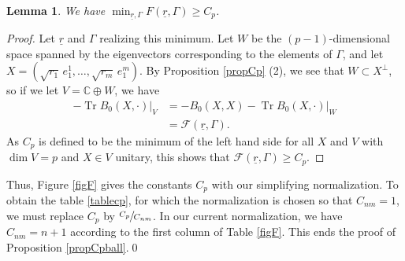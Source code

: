 \documentclass[JEP,XML,SOM,Unicode, NoEqCountersInSection,NoFloatCountersInSection,published]{cedram}
\let\mathcal\mathscr
\DeclareMathOperator{\Tr}{Tr}
\theoremstyle{theorem}
\newtheorem{lemma}[proposition]{Lemma}
\theoremstyle{definition}
\begin{document}
\begin{lemma} We have $\min_{\underline{r}, \Gamma} F(\underline{r}, \Gamma) \geq C_p$.
\end{lemma}
\begin{proof}
Let $\underline{r}$ and $\Gamma$ realizing this minimum. Let $W$ be the $(p-1)$-dimensional space spanned by the eigenvectors corresponding to the elements of $\Gamma$, and let $X = (\sqrt{r_1}\, e_1^1,\dots, \sqrt{r_m}\, e_1^m)$. By Proposition \ref{propCp} (2), we see that $W \subset X^{\perp}$, so if we let $V = \mathbb C \oplus W$, we have
\[
\begin{aligned}
- \Tr  B_0(X, \cdot)|_{V} & = - B_0(X, X) - \Tr  B_0(X, \cdot)|_{W} \\
& = \mathcal F(\underline{r}, \Gamma).
\end{aligned}
\]
As $C_p$ is defined to be the minimum of the left hand side for all $X$ and $V$ with $\dim V= p$ and $X \in V$ unitary, this shows that $\mathcal F(\underline{r}, \Gamma) \geq C_p$.
\end{proof}

Thus, Figure \ref{figF} gives the constants $C_p$ with our simplifying normalization. To obtain the table \ref{tablecp}, for which the normalization is chosen so that $C_{nm} = 1$, we must replace $C_p$ by $\sfrac{C_p}{C_{nm}}$. In our current normalization, we have $C_{nm} = n + 1$ according to the first column of Table \ref{figF}. This ends the proof of Proposition \ref{propCpball}.\qed

\backmatter


\end{document}
